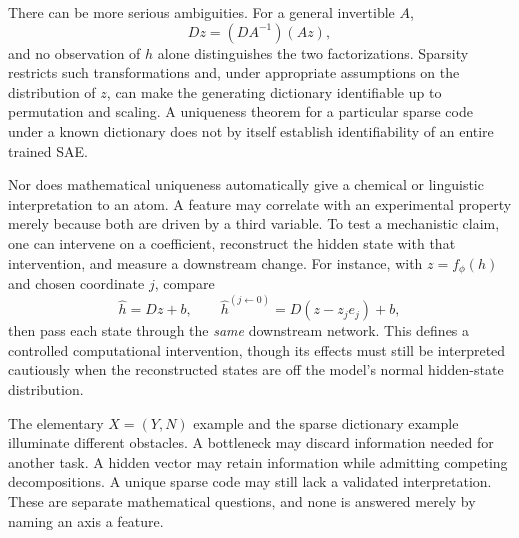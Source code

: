 There can be more serious ambiguities. For a general invertible \(A\),
\[
 Dz=(DA^{-1})(Az),
\]
and no observation of \(h\) alone distinguishes the two factorizations. Sparsity restricts such transformations and, under appropriate assumptions on the distribution of \(z\), can make the generating dictionary identifiable up to permutation and scaling. A uniqueness theorem for a particular sparse code under a known dictionary does not by itself establish identifiability of an entire trained SAE.

Nor does mathematical uniqueness automatically give a chemical or linguistic interpretation to an atom. A feature may correlate with an experimental property merely because both are driven by a third variable. To test a mechanistic claim, one can intervene on a coefficient, reconstruct the hidden state with that intervention, and measure a downstream change. For instance, with \(z=f_\phi(h)\) and chosen coordinate \(j\), compare
\[
 \widehat h=Dz+b,\qquad
 \widehat h^{(j\leftarrow 0)}
   =D(z-z_je_j)+b,
\]
then pass each state through the \emph{same} downstream network. This defines a controlled computational intervention, though its effects must still be interpreted cautiously when the reconstructed states are off the model's normal hidden-state distribution.

The elementary \(X=(Y,N)\) example and the sparse dictionary example illuminate different obstacles. A bottleneck may discard information needed for another task. A hidden vector may retain information while admitting competing decompositions. A unique sparse code may still lack a validated interpretation. These are separate mathematical questions, and none is answered merely by naming an axis a feature.
